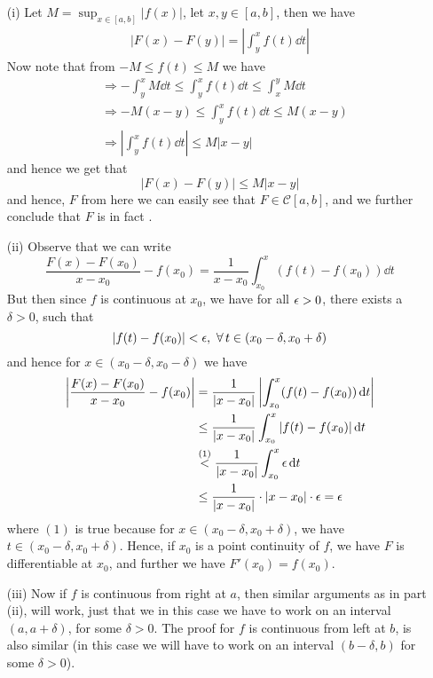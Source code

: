 \begin{prf}
\begin{enumerate}
    \item[(i)] Let $M = \sup_{x \in [a,b]} |f(x)|$, let $x,y \in [a,b]$, then we have 
    \begin{align*}
        |F(x) - F(y)| = \left| \int_y^x f(t) \dd{t} \right| 
    \end{align*}
    Now note that from $-M \leq f(t) \leq M $ we have 
    \begin{align*} 
        &\Rightarrow -\int_y^x M \dd{t} \leq \int_y^x f(t) \dd{t} \leq \int_x^y M \dd{t} \\ 
        &\Rightarrow -M(x-y) \leq \int_y^x f(t) \dd{t} \leq M(x-y) \\ 
        &\Rightarrow \left| \int_y^x f(t) \dd{t} \right| \leq M |x-y|
    \end{align*}
    and hence we get that 
    \[
        |F(x) - F(y)| \leq M |x-y|  
    \]
    and hence, $F$ from here we can easily see that $F \in \mathcal{C}[a,b]$, and we further conclude that $F$ is in fact .

    \item[(ii)] Observe that we can write 
    \[
        \frac{F(x)-F(x_0)}{x-x_0} - f(x_0) = \frac{1}{x-x_0} \int_{x_0}^x \left(f(t) - f(x_0)\right) \dd{t}   
    \] 
    But then since $f$ is continuous at $x_0$, we have for all $\epsilon > 0$, there exists a $\delta > 0$, such that 
    \[
        |f(t) - f(x_0)| < \eps, \ \forall \, t \in (x_0 - \delta, x_0 + \delta)  
    \]
    and hence for $x \in (x_0-\delta, x_0-\delta)$ we have 
    \begin{align*}
        \left| \frac{F(x)-F(x_0)}{x-x_0} - f(x_0) \right| &= \frac{1}{|x-x_0|} \left| \int_{x_0}^x (f(t) - f(x_0)) \dd{t} \right| \\ 
        &\leq \frac{1}{|x-x_0|} \int_{x_0}^x |f(t) - f(x_0)| \dd{t} \\ 
        &\overset{(1)}{<} \frac{1}{|x-x_0|} \int_{x_0}^x \epsilon \dd{t} \\ 
        &\leq \frac{1}{|x-x_0|} \cdot |x-x_0| \cdot \epsilon = \epsilon
    \end{align*}
    where $(1)$ is true because for $x \in (x_0 - \delta, x_0+\delta)$, we have $t \in (x_0-\delta,x_0+\delta)$. Hence, if $x_0$ is a point continuity of $f$, we have $F$ is differentiable at $x_0$, and further we have $F'(x_0) = f(x_0)$.

    \item[(iii)] Now if $f$ is continuous from right at $a$, then similar arguments as in part (ii), will work, just that we in this case we have to work on an interval $(a,a+\delta)$, for some $\delta > 0$. The proof for $f$ is continuous from left at $b$, is also similar (in this case we will have to work on an interval $(b-\delta,b)$ for some $\delta > 0$).  
\end{enumerate} 
\end{prf} 

